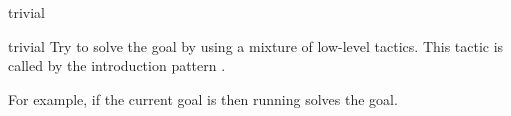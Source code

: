 \begin{tactic}{trivial}
  \begin{tsyntax}[empty]{trivial}
  Try to solve the goal by using a mixture of low-level tactics.
  This tactic is called by the introduction pattern \ec{//}.

  For example, if the current goal is
   then
  running 
  solves the goal.
  \end{tsyntax}
\end{tactic}
